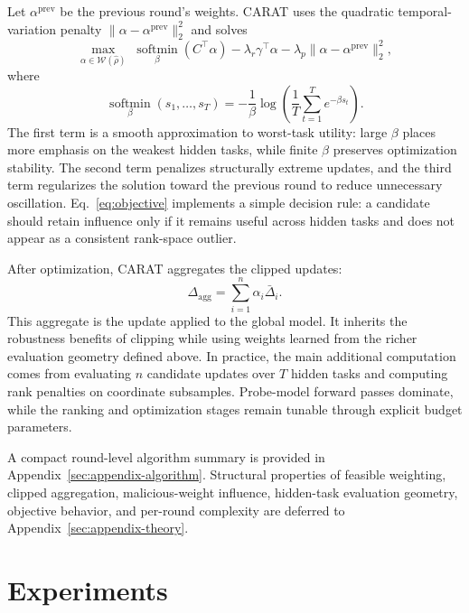 \documentclass{article}
\newcommand{\softmin}{\operatorname*{softmin}}
\begin{document}
Let $\alpha^{\mathrm{prev}}$ be the previous round's weights. CARAT uses the quadratic temporal-variation penalty $\|\alpha-\alpha^{\mathrm{prev}}\|_2^2$ and solves
\begin{equation}
\max_{\alpha \in \mathcal{W}(\hat{\rho})}
\;\softmin_{\beta}(C^\top \alpha)
- \lambda_r \gamma^\top \alpha
- \lambda_p \|\alpha - \alpha^{\mathrm{prev}}\|_2^2,
\label{eq:objective}
\end{equation}
where
\begin{equation}
\softmin_{\beta}(s_1,\dots,s_T)
= -\frac{1}{\beta}\log\left(\frac{1}{T}\sum_{t=1}^T e^{-\beta s_t}\right).
\label{eq:softmin}
\end{equation}
The first term is a smooth approximation to worst-task utility: large $\beta$ places more emphasis on the weakest hidden tasks, while finite $\beta$ preserves optimization stability. The second term penalizes structurally extreme updates, and the third term regularizes the solution toward the previous round to reduce unnecessary oscillation. Eq.~\eqref{eq:objective} implements a simple decision rule: a candidate should retain influence only if it remains useful across hidden tasks and does not appear as a consistent rank-space outlier.

After optimization, CARAT aggregates the clipped updates:
\begin{equation}
\Delta_{\mathrm{agg}} = \sum_{i=1}^n \alpha_i \bar{\Delta}_i.
\label{eq:aggregate}
\end{equation}
This aggregate is the update applied to the global model. It inherits the robustness benefits of clipping while using weights learned from the richer evaluation geometry defined above. In practice, the main additional computation comes from evaluating $n$ candidate updates over $T$ hidden tasks and computing rank penalties on coordinate subsamples. Probe-model forward passes dominate, while the ranking and optimization stages remain tunable through explicit budget parameters.

A compact round-level algorithm summary is provided in Appendix~\ref{sec:appendix-algorithm}. Structural properties of feasible weighting, clipped aggregation, malicious-weight influence, hidden-task evaluation geometry, objective behavior, and per-round complexity are deferred to Appendix~\ref{sec:appendix-theory}.

\section{Experiments}
\label{sec:experiments}
\end{document}

